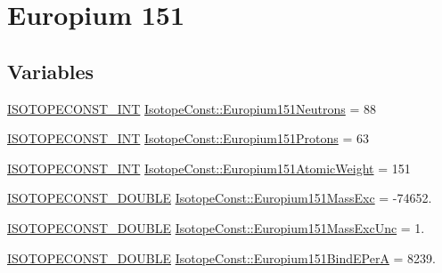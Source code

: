 \hypertarget{group___isotope_const-_europium-_eu151}{}\section{Europium 151}
\label{group___isotope_const-_europium-_eu151}
\subsection*{Variables}
\begin{DoxyCompactItemize}
\item 
\mbox{\hyperlink{group___isotope_const-_macros_ga5f18360b3e99483a35c32d789e62621c}{I\+S\+O\+T\+O\+P\+E\+C\+O\+N\+S\+T\+\_\+\+I\+NT}} \mbox{\hyperlink{group___isotope_const-_europium-_eu151_gac34ae3090ede7500a0f299989e6f2760}{Isotope\+Const\+::\+Europium151\+Neutrons}} = 88
\item 
\mbox{\hyperlink{group___isotope_const-_macros_ga5f18360b3e99483a35c32d789e62621c}{I\+S\+O\+T\+O\+P\+E\+C\+O\+N\+S\+T\+\_\+\+I\+NT}} \mbox{\hyperlink{group___isotope_const-_europium-_eu151_ga6f0c78136fbdb60cc04045176f714f01}{Isotope\+Const\+::\+Europium151\+Protons}} = 63
\item 
\mbox{\hyperlink{group___isotope_const-_macros_ga5f18360b3e99483a35c32d789e62621c}{I\+S\+O\+T\+O\+P\+E\+C\+O\+N\+S\+T\+\_\+\+I\+NT}} \mbox{\hyperlink{group___isotope_const-_europium-_eu151_ga7bb4f8439ac76aca6c9e7d9068a93aff}{Isotope\+Const\+::\+Europium151\+Atomic\+Weight}} = 151
\item 
\mbox{\hyperlink{group___isotope_const-_macros_ga8f45a7272ce02c0b4c65c44636ed719a}{I\+S\+O\+T\+O\+P\+E\+C\+O\+N\+S\+T\+\_\+\+D\+O\+U\+B\+LE}} \mbox{\hyperlink{group___isotope_const-_europium-_eu151_ga47b393bd4ab2ac294388fa940490a932}{Isotope\+Const\+::\+Europium151\+Mass\+Exc}} = -\/74652.
\item 
\mbox{\hyperlink{group___isotope_const-_macros_ga8f45a7272ce02c0b4c65c44636ed719a}{I\+S\+O\+T\+O\+P\+E\+C\+O\+N\+S\+T\+\_\+\+D\+O\+U\+B\+LE}} \mbox{\hyperlink{group___isotope_const-_europium-_eu151_gafd3b202c3197132445afc591960f684b}{Isotope\+Const\+::\+Europium151\+Mass\+Exc\+Unc}} = 1.
\item 
\mbox{\hyperlink{group___isotope_const-_macros_ga8f45a7272ce02c0b4c65c44636ed719a}{I\+S\+O\+T\+O\+P\+E\+C\+O\+N\+S\+T\+\_\+\+D\+O\+U\+B\+LE}} \mbox{\hyperlink{group___isotope_const-_europium-_eu151_ga796e9c9b1050e67b73e77a8b544e707f}{Isotope\+Const\+::\+Europium151\+Bind\+E\+PerA}} = 8239.
\item 

\end{DoxyCompactItemize}
